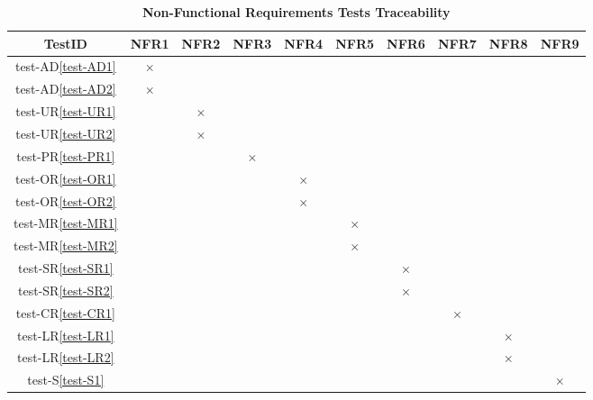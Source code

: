 \documentclass[12pt, titlepage]{article}
\begin{document}
\begin{table} [H]
  \centering
  \begin{tabular}{|c|c|c|c|c|c|c|c|c|c|}
    \hline
    TestID & NFR1 & NFR2 & NFR3 & NFR4 & NFR5 & NFR6 & NFR7 & NFR8 & NFR9 \\
    \hline
    test-AD\ref{test-AD1} & $\times$ & & & & & & & & \\
    \hline
    test-AD\ref{test-AD2} &  $\times$ & & & & & & & & \\
    \hline
    test-UR\ref{test-UR1} & & $\times$ &  & & & & & & \\
    \hline
    test-UR\ref{test-UR2} & & $\times$ & & & & & & &  \\
    \hline
    test-PR\ref{test-PR1} & & & $\times$ & & & & & & \\
    \hline
    test-OR\ref{test-OR1} & & & & $\times$ & & & & &  \\
    \hline
    test-OR\ref{test-OR2} & & & & $\times$ & & & & & \\
    \hline
    test-MR\ref{test-MR1} & & & & & $\times$ & & & &\\
    \hline
    test-MR\ref{test-MR2} & & & & & $\times$ & & & &  \\
    \hline
    test-SR\ref{test-SR1} & & & & & & $\times$ & & &\\
    \hline
    test-SR\ref{test-SR2} & & & & & & $\times$ & & & \\
    \hline
    test-CR\ref{test-CR1} & & & & & & & $\times$ & &\\
    \hline
    test-LR\ref{test-LR1} & & & & & & & & $\times$ &\\
    \hline
    test-LR\ref{test-LR2} & & & & & & & & $\times$ & \\
    \hline
    test-S\ref{test-S1} & & & & & & & & & $\times$ \\
    \hline
  \end{tabular}
\caption{\bf Non-Functional Requirements Tests Traceability} \label{tab:nfr-test-traceability}
\end{table}
\end{document}
